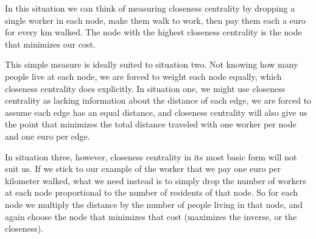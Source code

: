 \documentclass[a4paper,12pt]{article}
\begin{document}
In this situation we can think of measuring closeness centrality by dropping a single worker in each node, make them walk to work, then pay them each a euro for every km walked. The node with the highest closeness centrality is the node that minimizes our cost.

This simple measure is ideally suited to situation two. Not knowing how many people live at each node, we are forced to weight each node equally, which closeness centrality does explicitly. In situation one, we might use closeness centrality as lacking information about the distance of each edge, we are forced to assume each edge has an equal distance, and closeness centrality will also give us the point that minimizes the total distance traveled with one worker per node and one euro per edge.

In situation three, however, closeness centrality in its most basic form will not suit us. If we stick to our example of the worker that we pay one euro per kilometer walked, what we need instead is to simply drop the number of workers at each node proportional to the number of residents of that node. So for each node we multiply the distance by the number of people living in that node, and again choose the node that minimizes that cost (maximizes the inverse, or the closeness).
\end{document}
